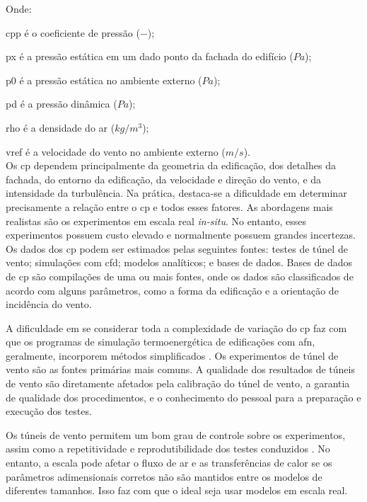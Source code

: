 \documentclass[brazil,hardcopy,openany]{ufscthesis} %
\begin{document}
Onde:

\gls{cpp} é o coeficiente de pressão ($-$);

\gls{px} é a pressão estática em um dado ponto da fachada do edifício ($Pa$);

\gls{p0} é a pressão estática no ambiente externo ($Pa$);

\gls{pd} é a pressão dinâmica ($Pa$);

\gls{rho} é a densidade do ar ($kg/m^3$);

\gls{vref} é a velocidade do vento no ambiente externo ($m/s$).
\\

Os \acrshort{cp} dependem principalmente da geometria da edificação, dos detalhes da fachada, do entorno da edificação, da velocidade e direção do vento, e da intensidade da turbulência. Na prática, destaca-se a dificuldade em determinar precisamente a relação entre o \acrshort{cp} e todos esses fatores. As abordagens mais realistas são os experimentos em escala real \textit{in-situ}. No entanto, esses experimentos possuem custo elevado e normalmente possuem grandes incertezas. 
Os dados dos \acrshort{cp} podem ser estimados pelas seguintes fontes: testes de túnel de vento; simulações com \acrshort{cfd}; modelos analíticos; e bases de dados.
Bases de dados de \acrshort{cp} são compilações de uma ou mais fontes, onde os dados são classificados de acordo com alguns parâmetros, como a forma da edificação e a orientação de incidência do vento. 

A dificuldade em se considerar toda a complexidade de variação do \acrshort{cp} faz com que os programas de simulação termoenergética de edificações com \acrshort{afn}, geralmente, incorporem métodos simplificados \cite{Costola2009}. Os experimentos de túnel de vento são as fontes primárias mais comuns. A qualidade dos resultados de túneis de vento são diretamente afetados pela calibração do túnel de vento, a garantia de qualidade dos procedimentos, e o conhecimento do pessoal para a preparação e execução dos testes.

Os túneis de vento permitem um bom grau de controle sobre os experimentos, assim como a repetitividade e reprodutibilidade dos testes conduzidos \cite{Omrani2017}. No entanto, a escala pode afetar o fluxo de ar e as transferências de calor se os parâmetros adimensionais corretos não são mantidos entre os modelos de diferentes tamanhos. Isso faz com que o ideal seja usar modelos em escala real.
\end{document}
